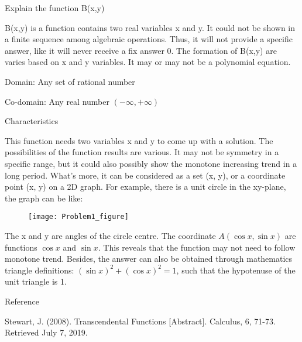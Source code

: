 \documentclass{article}
\begin{document}
\begin{small}
{Explain the function B(x,y)}
\end{small}


\begin{small}
B(x,y) is a function contains two real variables x and y. It could not be shown in a finite sequence among algebraic operations. Thus, it will not provide a specific answer, like it will never receive a fix answer 0. The formation of B(x,y) are varies based on x and y variables. It may or may not be a polynomial equation. \\
\end{small}

\begin{small}
{Domain: Any set of rational number } 
\end{small}

\begin{small}
{Co-domain: }Any real number $(- \infty, + \infty)$ \

\end{small}

\begin{small}
{Characteristics}
\end{small}


This function needs two variables x and y to come up with a solution. The possibilities of the function results are various. It may not be symmetry in a specific range, but it could also possibly show the monotone increasing trend in a long period. What’s more, it can be considered as a set (x, y), or a coordinate point (x, y) on a 2D graph. For example, there is a unit circle in the xy-plane, the graph can be like:  

\begin{figure}[h]
\begin{center}
\texttt{[image: Problem1\_figure]} 
\end{center}
\end{figure}



The x and y are angles of the circle centre. The coordinate $ A( \cos x , \sin x) $ are functions $  \cos x $ and $  \sin x $. This reveals that the function may not need to follow monotone trend. Besides, the answer can also be obtained through mathematics triangle definitions: $ (\sin x )^{2} + ( \cos x )^{2} = 1 $, such that the hypotenuse of the unit triangle is 1.
\\


\begin{small}
{Reference}
\end{small}

\begin{small}
Stewart, J. (2008). Transcendental Functions [Abstract]. Calculus, 6, 71-73. Retrieved July 7, 2019.
\end{small}
\end{document}
